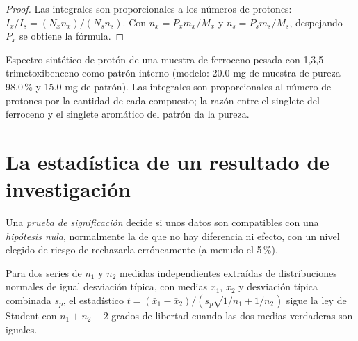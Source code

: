 \begin{proof}
Las integrales son proporcionales a los números de protones: $I_x/I_s = (N_xn_x)/(N_sn_s)$. Con
$n_x = P_xm_x/M_x$ y $n_s = P_sm_s/M_s$, despejando $P_x$ se obtiene la fórmula.
\end{proof}

\begin{omfigure}

{\small Espectro sintético de protón de una muestra de ferroceno pesada con
1,3,5-trimetoxibenceno como patrón interno (modelo: 20.0 mg de muestra de pureza
98.0\,\% y 15.0 mg de patrón). Las integrales son proporcionales al número de
protones por la cantidad de cada compuesto; la razón entre el singlete del ferroceno y
el singlete aromático del patrón da la pureza.}
\end{omfigure}

\section{La estadística de un resultado de investigación}

\begin{definition}\label{def:b3:lab-techniques-3:tests}
Una \emph{prueba de significación} decide si unos datos son
compatibles con una \emph{hipótesis nula}, normalmente la de que
no hay diferencia ni efecto, con un nivel elegido de riesgo de rechazarla
erróneamente (a menudo el 5\,\%).
\end{definition}

\begin{theorem}\label{thm:b3:lab-techniques-3:t-test}
Para dos series de $n_1$ y $n_2$ medidas independientes extraídas de distribuciones
normales de igual desviación típica, con medias $\bar x_1$, $\bar x_2$ y desviación típica
combinada $s_p$, el estadístico $t = (\bar x_1 - \bar x_2)/(s_p\sqrt{1/n_1 + 1/n_2})$ sigue la ley de Student con
$n_1 + n_2 - 2$ grados de libertad cuando las dos medias verdaderas son iguales. \admitted
\end{theorem}

